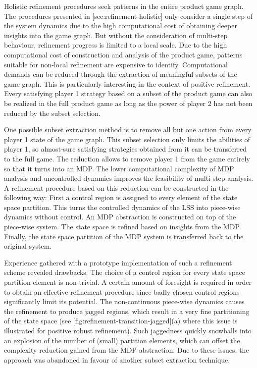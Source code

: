 Holistic refinement procedures seek patterns in the entire product game graph.
The procedures presented in [sec:refinement-holistic] only consider a single step of the system dynamics due to the high computational cost of obtaining deeper insights into the game graph.
But without the consideration of multi-step behaviour, refinement progress is limited to a local scale.
Due to the high computational cost of construction and analysis of the product game, patterns suitable for non-local refinement are expensive to identify.
Computational demands can be reduced through the extraction of meaningful subsets of the game graph.
This is particularly interesting in the context of positive refinement.
Every satisfying player 1 strategy based on a subset of the product game can also be realized in the full product game as long as the power of player 2 has not been reduced by the subset selection.

One possible subset extraction method is to remove all but one action from every player 1 state of the game graph.
This subset selection only limits the abilities of player 1, so almost-sure satisfying strategies obtained from it can be transferred to the full game.
The reduction allows to remove player 1 from the game entirely so that it turns into an MDP.
The lower computational complexity of MDP analysis and uncontrolled dynamics improves the feasibility of multi-step analysis.
A refinement procedure based on this reduction can be constructed in the following way:
First a control region is assigned to every element of the state space partition.
This turns the controlled dynamics of the LSS into piece-wise dynamics without control.
An MDP abstraction is constructed on top of the piece-wise system.
The state space is refined based on insights from the MDP.
Finally, the state space partition of the MDP system is transferred back to the original system.

Experience gathered with a prototype implementation of such a refinement scheme revealed drawbacks.
The choice of a control region for every state space partition element is non-trivial.
A certain amount of foresight is required in order to obtain an effective refinement procedure since badly chosen control regions significantly limit its potential.
The non-continuous piece-wise dynamics causes the refinement to produce jagged regions, which result in a very fine partitioning of the state space (see [fig:refinement-transition-jagged](a) where this issue is illustrated for positive robust refinement).
Such jaggedness quickly snowballs into an explosion of the number of (small) partition elements, which can offset the complexity reduction gained from the MDP abstraction.
Due to these issues, the approach was abandoned in favour of another subset extraction technique.

